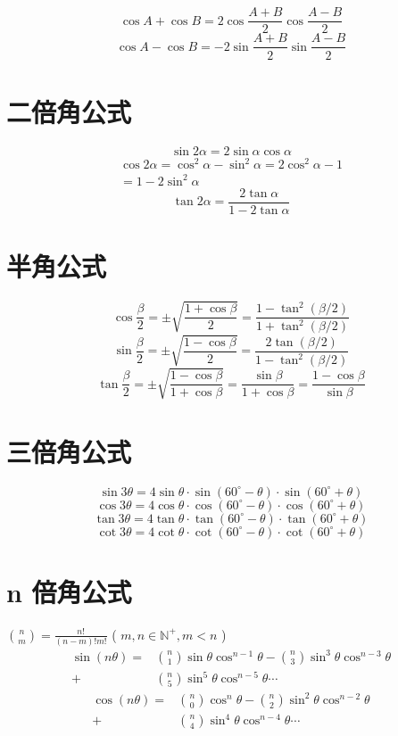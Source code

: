 \documentclass[a4paper, fleqn]{ctexart}
\newcommand{\degree}{^\circ}
\begin{document}
\begin{multicols}{2}
	\subsection{}
	\[ \cos A + \cos B 
	= 2 \cos \frac{A + B}{2} \cos \frac{A - B}{2} \]
	\[ \cos A - \cos B 
	=-2 \sin \frac{A + B}{2} \sin \frac{A - B}{2} \] 
	
	{
		\section{二倍角公式}
		\[ \sin2\alpha = 2 \sin\alpha \cos\alpha \]
		\begin{align*}
		\cos2\alpha = \cos^2\alpha-\sin^2\alpha
		= 2\cos^2\alpha - 1 \\ = 1 - 2\sin^2\alpha
		\end{align*}
		\[ \tan2\alpha = \frac{2\tan\alpha}{1-2\tan\alpha} \]
	
		\section{半角公式}
		\[ \cos\frac\beta2 = \pm \sqrt{\frac{1+\cos\beta}{2}}
	 	= \frac{1-\tan^2\left(\beta/2\right)}{1+\tan^2\left(\beta/2\right)} \]
		\[ \sin\frac\beta2 = \pm \sqrt{\frac{1-\cos\beta}{2}}
		= \frac{2\tan\left(\beta/2\right)}{1-\tan^2\left(\beta/2\right)} \]
		\[ \tan\frac\beta2 = \pm \sqrt{\frac{1-\cos\beta}{1+\cos\beta}}
		= \frac{\sin\beta}{1+\cos\beta}
		= \frac{1-\cos\beta}{\sin\beta}  \]
	
		\section{三倍角公式}
		\[ \sin3\theta = 4\sin\theta 
		\cdot \sin\left(60\degree-\theta\right)
		\cdot \sin\left(60\degree+\theta\right) \]
		\[ \cos3\theta = 4\cos\theta 
		\cdot \cos\left(60\degree-\theta\right)
		\cdot \cos\left(60\degree+\theta\right) \]
		\[ \tan3\theta = 4\tan\theta 
		\cdot \tan\left(60\degree-\theta\right)
		\cdot \tan\left(60\degree+\theta\right) \]
		\[ \cot3\theta = 4\cot\theta 
		\cdot \cot\left(60\degree-\theta\right)
		\cdot \cot\left(60\degree+\theta\right) \]
	}

	\section{n 倍角公式}
	$ \binom{n}{m} =\frac{n!}{\left( n - m\right)! m!} $
	( $ m, n \in \mathbb{N^+}, m < n $ )
	\begin{align*}
		\sin\left(n\theta\right)
		= & \binom n1\sin\theta\cos^{n-1}\theta
		- \binom n3\sin^{3}\theta\cos^{n-3}\theta \\
		+ & \binom n5\sin^{5}\theta\cos^{n-5}\theta \cdots 
	\end{align*}
	\begin{align*}
		\cos\left(n\theta\right) 
		= & \binom n0\cos^{n}\theta
		- \binom n2\sin^{2}\theta\cos^{n-2}\theta \\
		+ & \binom n4\sin^{4}\theta\cos^{n-4}\theta \cdots
	\end{align*}
	

\end{multicols}
\end{document}
